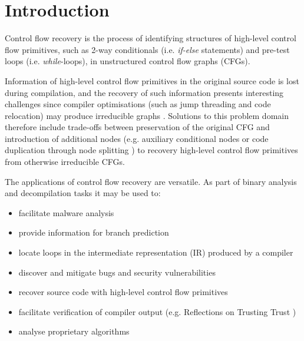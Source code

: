 
\section{Introduction}

Control flow recovery is the process of identifying structures of high-level control flow primitives, such as 2-way conditionals (i.e. \textit{if-else} statements) and pre-test loops (i.e. \textit{while}-loops), in unstructured control flow graphs (CFGs).

Information of high-level control flow primitives in the original source code is lost during compilation, and the recovery of such information presents interesting challenges since compiler optimisations (such as jump threading and code relocation) may produce irreducible graphs \cite{cifuentes_reverse_comp}. Solutions to this problem domain therefore include trade-offs between preservation of the original CFG and introduction of additional nodes (e.g. auxiliary conditional nodes \cite{no_more_gotos} or code duplication through node splitting \cite{node_splitting}) to recovery high-level control flow primitives from otherwise irreducible CFGs.

The applications of control flow recovery are versatile. As part of binary analysis and decompilation tasks it may be used to:

\begin{itemize}
	\item facilitate malware analysis
	\item provide information for branch prediction
	\item locate loops in the intermediate representation (IR) produced by a compiler
	\item discover and mitigate bugs and security vulnerabilities
	\item recover source code with high-level control flow primitives
	\item facilitate verification of compiler output (e.g. Reflections on Trusting Trust \cite{trusting_trust})
	\item analyse proprietary algorithms
\end{itemize}




